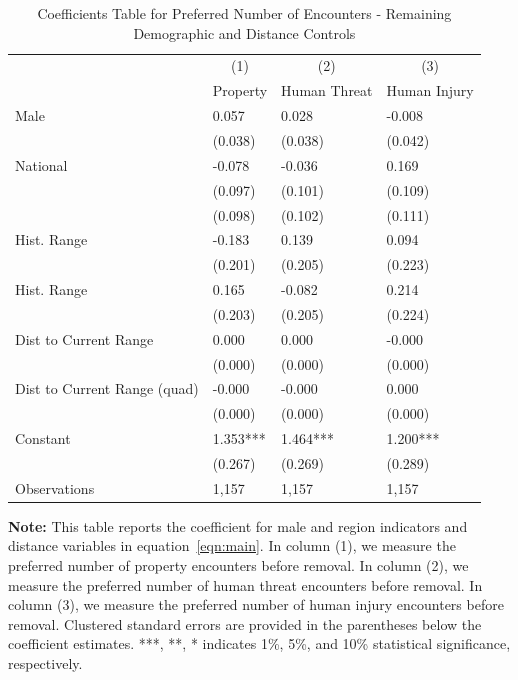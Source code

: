 \documentclass[english,12pt]{article}
\begin{document}
\begin{table}[H]
    \centering
    \caption{Coefficients Table for Preferred Number of Encounters - Remaining Demographic and Distance Controls}
    \footnotesize
    \begin{tabular}{@{}llll@{}}
        \toprule
                           &\multicolumn{1}{c}{(1)}   &\multicolumn{1}{c}{(2)}   &\multicolumn{1}{c}{(3)}  \\
                           & Property & Human Threat & Human Injury \\ \midrule
        Male        &       0.057   &       0.028   &      -0.008   \\
                    &     (0.038)   &     (0.038)   &     (0.042)   \\
        National    &      -0.078   &      -0.036   &       0.169   \\
                    &     (0.097)   &     (0.101)   &     (0.109)   \\
                    &     (0.098)   &     (0.102)   &     (0.111)   \\
        Hist. Range &      -0.183   &       0.139   &       0.094   \\
                    &     (0.201)   &     (0.205)   &     (0.223)   \\
        Hist. Range &       0.165   &      -0.082   &       0.214   \\
                    &     (0.203)   &     (0.205)   &     (0.224)   \\
        Dist to Current Range&       0.000   &       0.000   &      -0.000   \\
                    &     (0.000)   &     (0.000)   &     (0.000)   \\
        Dist to Current Range (quad)&      -0.000   &      -0.000   &       0.000   \\
                    &     (0.000)   &     (0.000)   &     (0.000)   \\\midrule                       
        Constant    &       1.353***&       1.464***&       1.200***\\
            &     (0.267)   &     (0.269)   &     (0.289)   \\
        Observations & 1,157    &  1,157       & 1,157        \\\bottomrule
    \end{tabular}
    \begin{minipage}{.9\textwidth}
        \vspace{1em}
    \footnotesize{{\bf{Note:}} This table reports the coefficient for male and region indicators and distance variables in equation~\ref{eqn:main}. In column (1), we measure the preferred number of property encounters before removal. In column (2), we measure the preferred number of human threat encounters before removal. In column (3), we measure the preferred number of human injury encounters before removal. Clustered standard errors are provided in the parentheses below the coefficient estimates. ***, **, * indicates 1\%, 5\%, and 10\% statistical significance, respectively.}
    \label{tab: des_gen}
    \end{minipage}
\end{table}
\end{document}
